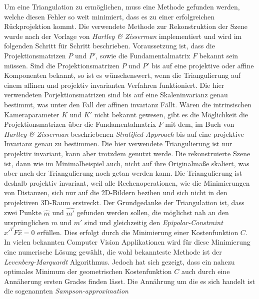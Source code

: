 Um eine Triangulation zu ermöglichen, muss eine Methode gefunden werden, welche diesen Fehler so weit minimiert, dass es zu einer erfolgreichen Rückprojektion kommt. Die verwendete Methode zur Rekonstruktion der Szene wurde nach der Vorlage von \textit{Hartley \& Zisserman}\cite{HZ} implementiert und wird im folgenden Schritt für Schritt beschrieben. Voraussetzung ist, dass die Projektionsmatrizen $P$ und $P'$, sowie die Fundamentalmatrix $F$ bekannt sein müssen. Sind die Projektionsmatrizen $P$ und $P'$ bis auf eine projektive oder affine Komponenten bekannt, so ist es wünschenswert, wenn die Triangulierung auf einem affinen und projektiv invarianten Verfahren funktioniert\cite{HZ}. Die hier verwendeten Porjektionsmatrizen sind bis auf eine Skaleninvarianz genau bestimmt, was unter den Fall der affinen invarianz Fällt. Wären die intrinsischen Kameraparameter $K$ und $K'$ nicht bekannt gewesen, gibt es die Möglichkeit die Projektionsmatrizen über die Fundamentalmatrix $F$ mit dem, im Buch von \textit{Hartley \& Zisserman} beschriebenen  \textit{Stratified-Approach} bis auf eine projektive Invarianz genau zu bestimmen\cite{HZ}. Die hier verwendete Triangulierung ist nur projektiv invariant, kann aber trotzdem genutzt werde. Die rekonstruierte Szene ist, dann wie im Minimalbeispiel auch, nicht auf ihre Originalmaße skaliert, was aber nach der Triangulierung noch getan werden kann. Die Triangulierung ist deshalb projektiv invariant, weil alle Rechenoperationen, wie die Minimierungen von Distanzen, sich nur auf die 2D-Bildern bezihen und sich nicht in den projektiven 3D-Raum erstreckt\cite{HZ}. Der Grundgedanke der Triangulation ist, dass zwei Punkte $\hat{m}$ und $\hat{m'}$ gefunden werden sollen, die möglichst nah an den ursprünglichen $m$ und $m'$ sind und gleichzeitig den \textit{Epipolar-Constraint} $\hat{x}'^TF\hat{x} = 0$ erfüllen. Dies erfolgt durch die Minimierung einer Kostenfunktion $C$. In vielen bekannten Computer Vision Applikationen wird für diese Minimierung eine numerische Lösung gewählt, die wohl bekannteste Methode ist der \textit{Levenberg-Marquardt} Algorithmus\cite{HZ}. Jedoch hat sich gezeigt, dass ein nahezu optimales Minimum der geometrischen Kostenfunktion $C$ auch durch eine Annäherung ersten Grades finden lässt. Die Annährung um die es sich handelt ist die sogenannten \textit{Sampson-approximation}


\label{sec:sampson}

